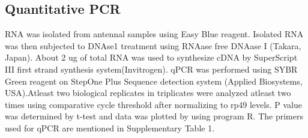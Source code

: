 \subsection*{Quantitative PCR}

RNA was isolated from antennal samples using Easy Blue reagent. Isolated RNA was then subjected to DNAse1 treatment using RNAase free DNAase I (Takara, Japan). About 2 ug of total RNA was used to synthesize cDNA by SuperScript III first strand synthesis system(Invitrogen). qPCR was performed using SYBR Green reagent on StepOne Plus Sequence detection system (Applied Biosystems, USA).Atleast two biological replicates in triplicates were analyzed atleast two times using comparative cycle threshold after normalizing to rp49 levels. P value was determined by t-test and data was plotted by using program R. The primers used for qPCR are mentioned in Supplementary Table 1.